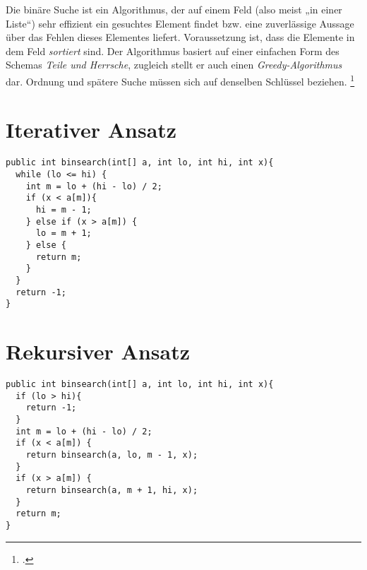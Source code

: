 \documentclass{lehramt-informatik-haupt}
\begin{document}
Die binäre Suche ist ein Algorithmus, der auf einem Feld (also meist „in
einer Liste“) sehr effizient ein gesuchtes Element findet bzw. eine
zuverlässige Aussage über das Fehlen dieses Elementes liefert.
Voraussetzung ist, dass die Elemente in dem Feld \emph{sortiert} sind.
Der Algorithmus basiert auf einer einfachen Form des Schemas \emph{Teile
und Herrsche}, zugleich stellt er auch einen \emph{Greedy-Algorithmus}
dar. Ordnung und spätere Suche müssen sich auf denselben Schlüssel
beziehen.
\footcite{wiki:binaere-suche}

\cite[Seite 17 (PDF 9)]{aud:fs:2}

\section{Iterativer Ansatz}

\begin{verbatim}
public int binsearch(int[] a, int lo, int hi, int x){
  while (lo <= hi) {
    int m = lo + (hi - lo) / 2;
    if (x < a[m]){
      hi = m - 1;
    } else if (x > a[m]) {
      lo = m + 1;
    } else {
      return m;
    }
  }
  return -1;
}
\end{verbatim}

\section{Rekursiver Ansatz}

\begin{verbatim}
public int binsearch(int[] a, int lo, int hi, int x){
  if (lo > hi){
    return -1;
  }
  int m = lo + (hi - lo) / 2;
  if (x < a[m]) {
    return binsearch(a, lo, m - 1, x);
  }
  if (x > a[m]) {
    return binsearch(a, m + 1, hi, x);
  }
  return m;
}
\end{verbatim}

\literatur
\end{document}
